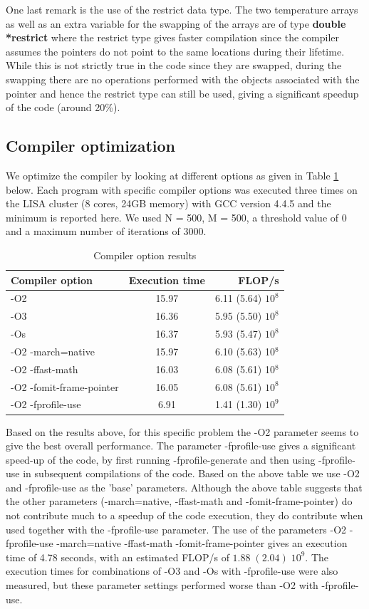 \documentclass[11pt,a4paper,onecolumn]{article}
\begin{document}
One last remark is the use of the restrict data type. The two temperature arrays as well as an extra variable for the swapping of the arrays are of type \textbf{double *restrict} where the restrict type gives faster compilation since the compiler assumes the pointers do not point to the same locations during their lifetime. While this is not strictly true in the code since they are swapped, during the swapping there are no operations performed with the objects associated with the pointer and hence the restrict type can still be used, giving a significant speedup of the code (around 20\%).

\subsection{Compiler optimization}
We optimize the compiler by looking at different options as given in Table \ref{tab:compiler} below. Each program with specific compiler options was executed three times on the LISA cluster (8 cores, 24GB memory) with GCC version 4.4.5 and the minimum is reported here. We used N = 500, M = 500, a threshold value of 0 and a maximum number of iterations of 3000. 

\begin{table}[H]
  \centering
  \begin{tabular}{l | c | r}
    Compiler option & Execution time & FLOP/s \\
    \hline
    -O2 & 15.97 & 6.11 (5.64) $10^8$\\
    -O3 & 16.36 & 5.95 (5.50) $10^8$\\
    -Os & 16.37 & 5.93 (5.47) $10^8$\\
    -O2 -march=native & 15.97 & 6.10 (5.63) 10$^8$ \\
    -O2 -ffast-math & 16.03 & 6.08 (5.61) 10$^8$ \\
    -O2 -fomit-frame-pointer & 16.05 & 6.08 (5.61) $10^8$ \\
    -O2 -fprofile-use & 6.91 & 1.41 (1.30) $10^9$ \\
    \end{tabular}
  \caption{Compiler option results}
  \label{tab:compiler}
\end{table}

Based on the results above, for this specific problem the -O2 parameter seems to give the best overall performance. The parameter -fprofile-use gives a significant speed-up of the code, by first running -fprofile-generate and then using -fprofile-use in subsequent compilations of the code. Based on the above table we use -O2 and -fprofile-use as the 'base'  parameters. Although the above table suggests that the other parameters (-march=native, -ffast-math and -fomit-frame-pointer) do not contribute much to a speedup of the code execution, they do contribute when used together with the -fprofile-use parameter. The use of the parameters -O2 -fprofile-use -march=native -ffast-math -fomit-frame-pointer gives an execution time of 4.78 seconds, with an estimated FLOP/s of $1.88 \; (2.04) \; 10^9$. The execution times for combinations of -O3 and -Os with -fprofile-use were also measured, but these parameter settings performed worse than -O2 with -fprofile-use.
\end{document}
